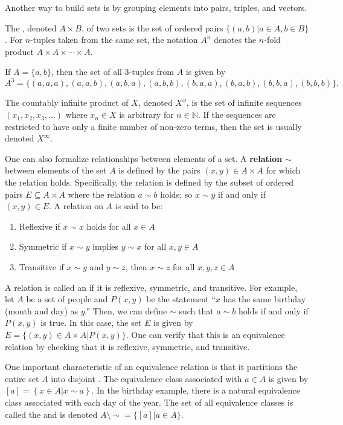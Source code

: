 Another way to build sets is by grouping elements into pairs, triples, and vectors.
\begin{definition}
The , denoted $A\times B$, of two sets is the set of ordered pairs $\{(a,b) | a\in A, b\in B\}$.
For $n$-tuples taken from the same set, the notation $A^n$ denotes the $n$-fold product $A\times A \times \cdots \times A$.
\end{definition}
\begin{example}
If $A  = \{ a,b \}$, then the set of all 3-tuples from $A$ is given by 
\begin{equation*}
A^3 = \{ (a,a,a),(a,a,b),(a,b,a),(a,b,b),(b,a,a),(b,a,b),(b,b,a),(b,b,b) \}.
\end{equation*}
\end{example}
The countably infinite product of $X$, denoted $X^\omega$, is the set of infinite sequences $(x_1,x_2,x_3,\ldots)$ where $x_n \in X$ is arbitrary for $n\in \mathbb{N}$.
If the sequences are restricted to have only a finite number of non-zero terms, then the set is usually denoted $X^\infty$.

One can also formalize relationships between elements of a set.
A \textbf{relation} $\sim$ between elements of the set $A$ is defined by the pairs $(x,y)\in A\times A$ for which the relation holds.
Specifically, the relation is defined by the subset of ordered pairs $E\subseteq A\times A$ where the relation $a\sim b$ holds; so $x\sim y$ if and only if $(x,y)\in E$.
A relation on $A$ is said to be:
\begin{enumerate}
\item Reflexive if $x\sim x$ holds for all $x\in A$
\item Symmetric if $x\sim y$ implies $y\sim x$ for all $x,y\in A$
\item Transitive if $x\sim y$ and $y\sim z$, then $x\sim z$ for all $x,y,z\in A$
\end{enumerate}

A relation is called an  if it is reflexive, symmetric, and transitive.
For example, let $A$ be a set of people and $P(x,y)$ be the statement ``$x$ has the same birthday (month and day) as $y$.''
Then, we can define $\sim$ such that $a\sim b$ holds if and only if $P(x,y)$ is true.
In this case, the set $E$ is given by $E = \{ (x,y)\in A\times A | P(x,y) \}$.
One can verify that this is an equivalence relation by checking that it is reflexive, symmetric, and transitive.

One important characteristic of an equivalence relation is that it partitions the entire set $A$ into disjoint .
The equivalence class associated with $a\in A$ is given by  $[a] = \left\{x\in A | x \sim a\right\}$.
In the birthday example, there is a natural equivalence class associated with each day of the year.
The set of all equivalence classes is called the  and is denoted $A \setminus \!\sim = \{ [a] | a\in A \}$.

